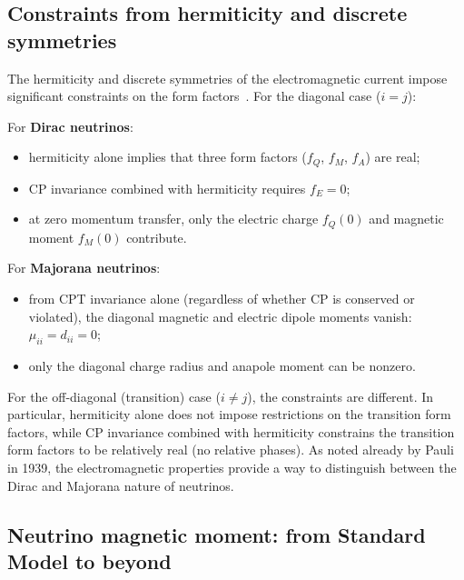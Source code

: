 \documentclass[a4paper,11pt]{article}
\begin{document}
\subsection{Constraints from hermiticity and discrete symmetries}

The hermiticity and discrete symmetries of the electromagnetic current impose significant constraints on the form factors~\cite{Giunti:2015RMP}. For the diagonal case ($i = j$):

\noindent For \textbf{Dirac neutrinos}:
\begin{itemize}
\item hermiticity alone implies that three form factors ($f_Q$, $f_M$, $f_A$) are real;
\item CP invariance combined with hermiticity requires $f_E = 0$;
\item at zero momentum transfer, only the electric charge $f_Q(0)$ and magnetic moment $f_M(0)$ contribute.
\end{itemize}

\noindent For \textbf{Majorana neutrinos}:
\begin{itemize}
\item from CPT invariance alone (regardless of whether CP is conserved or violated), the diagonal magnetic and electric dipole moments vanish: $\mu_{ii} = d_{ii} = 0$;
\item only the diagonal charge radius and anapole moment can be nonzero.
\end{itemize}

For the off-diagonal (transition) case ($i \neq j$), the constraints are different. In particular, hermiticity alone does not impose restrictions on the transition form factors, while CP invariance combined with hermiticity constrains the transition form factors to be relatively real (no relative phases). As noted already by Pauli in 1939, the electromagnetic properties provide a way to distinguish between the Dirac and Majorana nature of neutrinos.

\subsection{Neutrino magnetic moment: from Standard Model to beyond}
\end{document}
